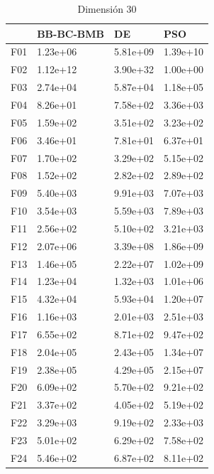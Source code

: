 \begin{table}[H]
\begin{minipage}{.5\linewidth}
    \end{minipage}%
    \begin{minipage}{.5\linewidth}
      \centering
        \caption{Dimensión 30}
        \begin{tabular}{llll}
          \toprule
          {} & BB-BC-BMB &        DE &       PSO \\
          \midrule
          F01  &  1.23e+06 &  5.81e+09 &  1.39e+10 \\
          F02  &  1.12e+12 &  3.90e+32 &  1.00e+00 \\
          F03  &  2.74e+04 &  5.87e+04 &  1.18e+05 \\
          F04  &  8.26e+01 &  7.58e+02 &  3.36e+03 \\
          F05  &  1.59e+02 &  3.51e+02 &  3.23e+02 \\
          F06  &  3.46e+01 &  7.81e+01 &  6.37e+01 \\
          F07  &  1.70e+02 &  3.29e+02 &  5.15e+02 \\
          F08  &  1.52e+02 &  2.82e+02 &  2.89e+02 \\
          F09  &  5.40e+03 &  9.91e+03 &  7.07e+03 \\
          F10  &  3.54e+03 &  5.59e+03 &  7.89e+03 \\
          F11  &  2.56e+02 &  5.10e+02 &  3.21e+03 \\
          F12  &  2.07e+06 &  3.39e+08 &  1.86e+09 \\
          F13  &  1.46e+05 &  2.22e+07 &  1.02e+09 \\
          F14  &  1.23e+04 &  1.32e+03 &  1.01e+06 \\
          F15  &  4.32e+04 &  5.93e+04 &  1.20e+07 \\
          F16  &  1.16e+03 &  2.01e+03 &  2.51e+03 \\
          F17  &  6.55e+02 &  8.71e+02 &  9.47e+02 \\
          F18  &  2.04e+05 &  2.43e+05 &  1.34e+07 \\
          F19  &  2.38e+05 &  4.29e+05 &  2.15e+07 \\
          F20  &  6.09e+02 &  5.70e+02 &  9.21e+02 \\
          F21  &  3.37e+02 &  4.05e+02 &  5.19e+02 \\
          F22  &  3.29e+03 &  9.19e+02 &  2.33e+03 \\
          F23  &  5.01e+02 &  6.29e+02 &  7.58e+02 \\
          F24  &  5.46e+02 &  6.87e+02 &  8.11e+02 \\

\end{tabular}
\end{minipage}
\end{table}

